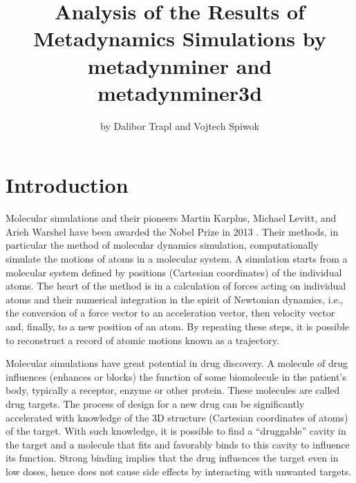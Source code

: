 \title{Analysis of the Results of Metadynamics Simulations by
metadynminer and metadynminer3d}
\author{by Dalibor Trapl and Vojtech Spiwok}

\maketitle


\hypertarget{introduction}{%
\section{Introduction}\label{introduction}}

Molecular simulations and their pioneers Martin Karplus, Michael Levitt,
and Arieh Warshel have been awarded the Nobel Prize in 2013
\citep{nobel}. Their methods, in particular the method of molecular
dynamics simulation, computationally simulate the motions of atoms in a
molecular system. A simulation starts from a molecular system defined by
positions (Cartesian coordinates) of the individual atoms. The heart of
the method is in a calculation of forces acting on individual atoms and
their numerical integration in the spirit of Newtonian dynamics, i.e.,
the conversion of a force vector to an acceleration vector, then
velocity vector and, finally, to a new position of an atom. By repeating
these steps, it is possible to reconstruct a record of atomic motions
known as a trajectory.

Molecular simulations have great potential in drug discovery. A molecule
of drug influences (enhances or blocks) the function of some biomolecule
in the patient's body, typically a receptor, enzyme or other protein.
These molecules are called drug targets. The process of design for a new
drug can be significantly accelerated with knowledge of the 3D structure
(Cartesian coordinates of atoms) of the target. With such knowledge, it
is possible to find a ``druggable'' cavity in the target and a molecule
that fits and favorably binds to this cavity to influence its function.
Strong binding implies that the drug influences the target even in low
doses, hence does not cause side effects by interacting with unwanted
targets.

